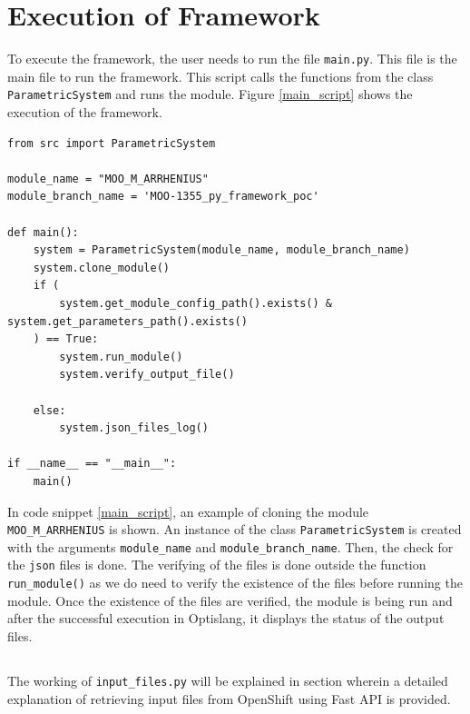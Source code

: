 \section{Execution of Framework}
To execute the framework, the user needs to run the file \texttt{main.py}. This file is the main file to run the framework. This script calls the functions
from the class \texttt{ParametricSystem} and runs the module. Figure \ref{main_script} shows the execution of the framework.
\renewcommand{\lstlistingname}{Code}
\begin{lstlisting}[style=pythoncode, caption={Execution of framework using \texttt{main.py}}, label={main_script}]
from src import ParametricSystem

module_name = "MOO_M_ARRHENIUS"
module_branch_name = 'MOO-1355_py_framework_poc'

def main():
    system = ParametricSystem(module_name, module_branch_name)
    system.clone_module()
    if (
        system.get_module_config_path().exists() & system.get_parameters_path().exists()
    ) == True:
        system.run_module()
        system.verify_output_file()

    else:
        system.json_files_log()

if __name__ == "__main__":
    main()
\end{lstlisting}

In code snippet \ref{main_script}, an example of cloning the module \texttt{MOO\_M\_ARRHENIUS} is shown. An instance of the class \texttt{ParametricSystem} 
is created with the arguments \texttt{module\_name} and \texttt{module\_branch\_name}. Then, the check for the \texttt{\acrshort{json}} files is done. 
The verifying of the files is done outside the function \texttt{run\_module()} as we do need to verify the existence of the files before running the module.
Once the existence of the files are verified, the module is being run and after the successful execution in Optislang, it displays the status of the output
files. 


\subsection*{}
The working of \texttt{input\_files.py} will be explained in section %
wherein a detailed explanation of retrieving input files from OpenShift using Fast API is provided.


